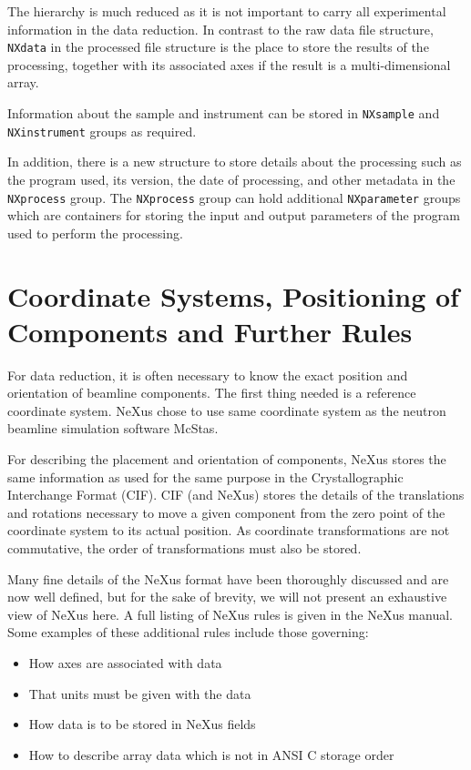 \documentclass[%
 aip,
rsi,
 amsmath,amssymb,
 reprint,%
]{revtex4-1}
\begin{document}
The hierarchy is much reduced as it is not important to carry all experimental information in the data 
reduction. In contrast to the raw data file structure, \texttt{NXdata} in the processed file structure is the place 
to store the results of the processing, together with its associated axes if the result is a multi-dimensional array.   
 
Information about the sample and instrument can be stored in \texttt{NXsample} and \texttt{NXinstrument} groups as required. 

In addition, there is a new structure to store details about the processing such as the program used, its version, 
the date of processing, and other metadata 
in the \texttt{NXprocess} group. The \texttt{NXprocess} group can hold additional \texttt{NXparameter} groups which are containers 
for storing the input and output parameters of the program used to perform the processing. 

\section{Coordinate Systems, Positioning of Components and Further Rules}

For data reduction, it is often necessary to know the exact position and orientation of beamline components. 
The first thing needed is a reference coordinate system. NeXus chose to use same coordinate system as the 
neutron beamline simulation software McStas\cite{mcstas}. 

For describing the placement and orientation of components, NeXus stores the same information as used for the 
same purpose in the Crystallographic Interchange Format (CIF)\cite{ITCVG}. CIF (and NeXus) stores the details 
of the translations and rotations necessary to move a given component from the zero point of the coordinate 
system to its actual position. As coordinate transformations are not commutative, the order of transformations 
must also be stored.

Many fine details of the NeXus format have been thoroughly discussed and are now well defined, but for the sake 
of brevity, we will not present an exhaustive view of NeXus here. A full listing of NeXus rules is given in the 
NeXus manual\cite{nxman}. Some examples of these additional rules include those governing:
\begin{itemize}
\item How axes are associated with data
\item That units must be given with the data
\item How data is to be stored in NeXus fields
\item How to describe array data which is not in ANSI C storage order
\end{itemize}
\end{document}
